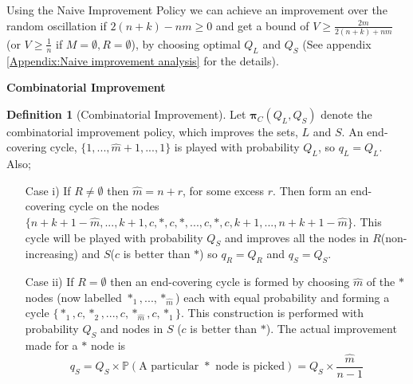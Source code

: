 \documentclass[a4paper,10pt]{article}
\theoremstyle{definition}
\newtheorem{definition}[theorem]{Definition}
\theoremstyle{definition}
\theoremstyle{remark}
\theoremstyle{definition}
\begin{document}
\begin{examplefigure}
\begin{center}
{\begin{tikzpicture}[-,auto,node distance=1.5cm,
                    thick,main node/.style={circle,fill=white,draw,font=\sffamily\Large\bfseries}]
   
\end{tikzpicture}
}
\end{center}
\caption{The Naive Improvement on $S_{4}^{9}$ for $m=9$. The \textcolor{red}{red lines indicating the end-covering cycle $\{1,2,3,4,5,4,3,2,1 \}$} and the other coloured lines indicating the end-ensuring cycles, for each $*$, $\{*,c,10,9,8,9,10,c,* \}$ (as $\hat{m}=4$).}
\end{examplefigure}


Using the Naive Improvement Policy we can achieve an improvement over the random oscillation if $2(n+k) -nm \geq 0$ and get a bound of $V \geq \frac{2m}{2(n+k)+nm}$ (or $V \geq \frac{1}{n}$ if $M=\emptyset,R=\emptyset$), by choosing optimal $Q_{L}$ and $Q_{S}$ (See appendix \ref{Appendix:Naive improvement analysis} for the details).


\begin{myfigure}
\begin{center}

\end{center}
\caption{Interception probabilities of $S^5_{4}$ when $m=4$, with the \textcolor{red}{red Probabilities showing the Naive Improvement Policy $\bm{\pi}_{N}\left(\frac{2}{17},\frac{6}{17} \right)$}.}
\end{myfigure}

\textbf{Combinatorial Improvement}

\begin{definition}[Combinatorial Improvement]
Let $\bm{\pi}_{C}(Q_{L},Q_{S})$ denote the combinatorial improvement policy, which improves the sets, $L$ and $S$. An end-covering cycle, $\{ 1,...,\hat{m}+1,...,1 \}$ is played with probability $Q_{L}$, so $q_{L}=Q_{L}$. Also;

\begin{enumerate}
\item[Case i)] If $R \neq \emptyset$ then $\hat{m}=n+r$, for some excess $r$. Then form an end-covering cycle on the nodes $\{ n+k+1-\hat{m},...,k+1,c,*,c,*,...,c,*,c,k+1,...,n+k+1-\hat{m} \}$. This cycle will be played with probability $Q_{S}$ and improves all the nodes in $R$(non-increasing) and $S$($c$ is better than $*$) so $q_{R}=Q_{R}$ and $q_{S}=Q_{S}$.

\item[Case ii)] If $R = \emptyset$ then an end-covering cycle is formed by choosing $\hat{m}$ of the $*$ nodes (now labelled $*_{1},...,*_{\hat{m}}$) each with equal probability and forming a cycle $\{*_{1},c,*_{2},...,c,*_{\hat{m}},c,*_{1} \}$. This construction is performed with probability $Q_{S}$ and nodes in $S$ ($c$ is better than $*$). The actual improvement made for a $*$ node is $$q_{S}=Q_{S} \times \mathbb{P}(\text{A particular } * \text{ node is picked})=Q_{S} \times \frac{\hat{m}}{n-1} $$
\end{enumerate}
\end{definition}
\end{document}
